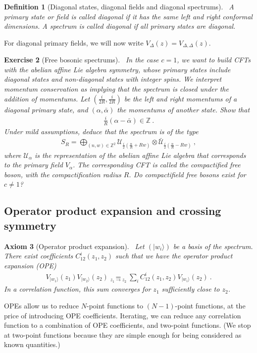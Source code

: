 \documentclass[12pt, a4paper]{article}
\theoremstyle{break}
\newtheorem{exo}{Exercise}[section]
\newtheorem{hyp}[exo]{Axiom}
\newtheorem{defn}[exo]{Definition}
\begin{document}
\begin{defn}[Diagonal states, diagonal fields and diagonal spectrums]
 ~\label{def:diag}
 A primary state or field is called diagonal if it has the same left and right conformal dimensions. A spectrum is called diagonal if all primary states are diagonal.
\end{defn}
For diagonal primary fields, we will now write  $V_\Delta(z) = V_{\Delta,\Delta}(z)$.

\begin{tcolorbox}
\begin{exo}[Free bosonic spectrums]
~\label{exo:fbs}
In the case $c=1$, we want to build CFTs with the abelian affine Lie algebra symmetry, whose primary states include diagonal states and non-diagonal states with integer spins. We interpret momentum conservation as implying that the spectrum is closed under the addition of momentums. Let $(\frac{i}{2R},\frac{i}{2R})$ be the left and right momentums of a diagonal primary state, and $(\alpha,\bar\alpha)$ the momentums of another state. Show that 
\begin{align}
 \frac{i}{R}(\alpha-\bar\alpha)\in\mathbb{Z}\ .
\end{align}
Under mild assumptions, deduce that the spectrum is of the type 
 \begin{align}
 S_R = \bigoplus_{(n,w)\in {\mathbb{Z}^2}} \mathcal{U}_{\frac{i}{2}\left(\frac{n}{R} + Rw\right)} \otimes \bar{\mathcal{U}}_{\frac{i}{2}\left(\frac{n}{R} - Rw\right)} \ ,
\label{sr}
\end{align}
where $\mathcal{U}_\alpha$ is the representation of the abelian affine Lie algebra that corresponds to the primary field $V_\alpha$. The corresponding CFT is called the compactified free boson, with the compactification radius $R$. Do compactifield free bosons exist for $c\neq 1$?
\end{exo}
\end{tcolorbox}

\subsection{Operator product expansion and crossing symmetry}

\begin{hyp}[Operator product expansion]
 ~\label{hyp:ope}
 Let $(|w_i\rangle)$ be a basis of the spectrum.
 There exist coefficients $C^i_{12}(z_1,z_2)$ such that we have the operator product expansion (OPE) 
 \begin{align}
  V_{|w_1\rangle}(z_1)V_{|w_2\rangle}(z_2) \underset{z_1\to z_2}{=} \sum_i C^i_{12}(z_1,z_2) V_{|w_i\rangle}(z_2)\ .
 \end{align}
 In a correlation function,
 this sum converges for $z_1$ sufficiently close to $z_2$.
\end{hyp}
OPEs allow us to reduce $N$-point functions to $(N-1)$-point functions, at the price of introducing OPE coefficients. 
Iterating, we can reduce any correlation function to a combination of OPE coefficients, and two-point functions. (We stop at two-point functions because they are simple enough for being considered as known quantities.) 
\end{document}
